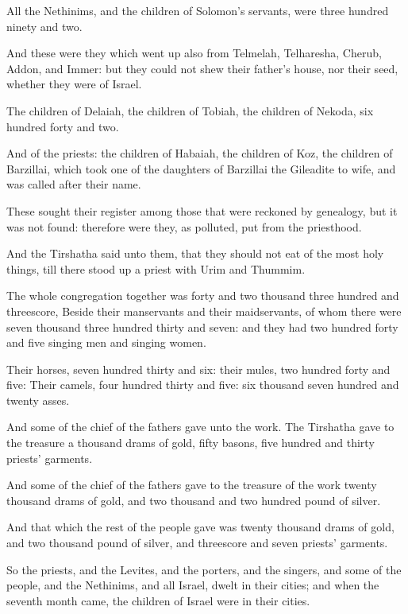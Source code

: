 \Verse All the Nethinims, and the children of Solomon's servants, were three hundred ninety and two.

\Verse And these were they which went up also from Telmelah, Telharesha, Cherub, Addon, and Immer: but they could not shew their father's house, nor their seed, whether they were of Israel.

\Verse The children of Delaiah, the children of Tobiah, the children of Nekoda, six hundred forty and two.

\Verse And of the priests: the children of Habaiah, the children of Koz, the children of Barzillai, which took one of the daughters of Barzillai the Gileadite to wife, and was called after their name.

\Verse These sought their register among those that were reckoned by genealogy, but it was not found: therefore were they, as polluted, put from the priesthood.

\Verse And the Tirshatha said unto them, that they should not eat of the most holy things, till there stood up a priest with Urim and Thummim.

\Verse The whole congregation together was forty and two thousand three hundred and threescore, \Verse Beside their manservants and their maidservants, of whom there were seven thousand three hundred thirty and seven: and they had two hundred forty and five singing men and singing women.

\Verse Their horses, seven hundred thirty and six: their mules, two hundred forty and five: \Verse Their camels, four hundred thirty and five: six thousand seven hundred and twenty asses.

\Verse And some of the chief of the fathers gave unto the work. The Tirshatha gave to the treasure a thousand drams of gold, fifty basons, five hundred and thirty priests' garments.

\Verse And some of the chief of the fathers gave to the treasure of the work twenty thousand drams of gold, and two thousand and two hundred pound of silver.

\Verse And that which the rest of the people gave was twenty thousand drams of gold, and two thousand pound of silver, and threescore and seven priests' garments.

\Verse So the priests, and the Levites, and the porters, and the singers, and some of the people, and the Nethinims, and all Israel, dwelt in their cities; and when the seventh month came, the children of Israel were in their cities.


